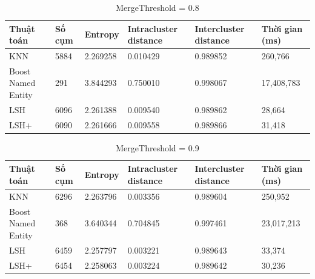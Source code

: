 		\begin{table}[H]
			\centering
			\setlength\extrarowheight{3pt}
			\begin{tabular}{|l|p{1.4cm}|p{1.5cm}|p{2cm}|p{2cm}|p{1.8cm}|}
				\hline
				Thuật toán  & Số cụm   & Entropy & Intracluster distance & Intercluster distance & Thời gian (ms) \\
			     \hline
				KNN & 5884 & 2.269258 & 0.010429 & 0.989852 & 260,766  \\
				\hline
				Boost Named Entity & 291 & 3.844293 & 0.750010 & 0.998067 & 17,408,783 \\
				\hline
				LSH & 6096 & 2.261388 & 0.009540 & 0.989862 & 28,664  \\
				\hline
				LSH+ & 6090 & 2.261666 & 0.009558 & 0.989866 & 31,418  \\
				\hline
			\end{tabular}%
			\caption{MergeThreshold = 0.8} \label{tab:table_4_8}%
		\end{table}
		
		\begin{table}[H]
			\centering
			\setlength\extrarowheight{3pt}
			\begin{tabular}{|l|p{1.4cm}|p{1.5cm}|p{2cm}|p{2cm}|p{1.8cm}|}
				\hline
				Thuật toán  & Số cụm   & Entropy & Intracluster distance & Intercluster distance & Thời gian (ms) \\
		    	\hline
				KNN & 6296 & 2.263796 & 0.003356 & 0.989604 & 250,952  \\
				\hline
				Boost Named Entity & 368 & 3.640344 & 0.704845 & 0.997461 & 23,017,213 \\
				\hline
				LSH & 6459 & 2.257797 & 0.003221 & 0.989643 & 33,374  \\
				\hline
				LSH+ & 6454 & 2.258063 & 0.003224 & 0.989642 & 30,236  \\
				\hline
			\end{tabular}%
			\caption{MergeThreshold = 0.9} \label{tab:table_4_9}%
		\end{table}

		
